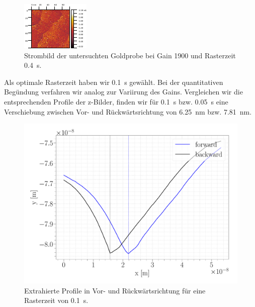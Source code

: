 \begin{figure}[H]
\centering
\includegraphics[width=\textwidth]{../Gwyddion/Gold/TIME_04_I_forward.pdf}
\caption{Strombild der untersuchten Goldprobe bei Gain 1900 und Rasterzeit \SI{0.4}{s}.}
\label{TIME_04_I}
\end{figure}

Als optimale Rasterzeit haben wir \SI{0,1}{s} gewählt. Bei der quantitativen Begündung verfahren wir analog zur Variirung des Gains. Vergleichen wir die entsprechenden Profile der z-Bilder, finden wir für \SI{0,1}{s} bzw. \SI{0,05}{s} eine Verschiebung zwischen Vor- und Rückwärtsrichtung von \SI{6,25}{nm} bzw. \SI{7,81}{nm}.

\begin{figure}[H]
\centering
\includegraphics[width=\textwidth]{../Figures/TIME_01_profile.pdf}
\caption{Extrahierte Profile in Vor- und Rückwärtsrichtung für eine Rasterzeit von \SI{0.1}{s}.}
\label{TIME_01_profile}
\end{figure}

